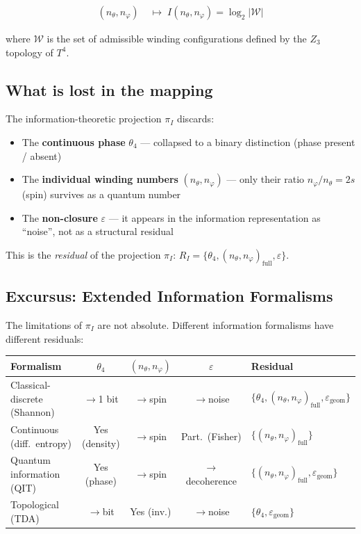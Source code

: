 \begin{align}
  (n_\theta, n_\varphi) &\;\longmapsto\; I(n_\theta, n_\varphi)
  = \log_2 |\mathcal{W}| \tag{243.3}
\end{align}

where $\mathcal{W}$ is the set of admissible winding configurations
defined by the $Z_3$ topology of $T^4$.

\subsection{What is lost in the mapping}

The information-theoretic projection $\pi_I$ discards:

\begin{itemize}
  \item The \textbf{continuous phase} $\theta_4$ --- collapsed to a
        binary distinction (phase present / absent)
  \item The \textbf{individual winding numbers} $(n_\theta, n_\varphi)$
        --- only their ratio $n_\varphi / n_\theta = 2s$ (spin)
        survives as a quantum number
  \item The \textbf{non-closure} $\varepsilon$ --- it appears in the
        information representation as ``noise'', not as a structural residual
\end{itemize}

This is the \emph{residual} of the projection $\pi_I$:
$R_I = \{\theta_4, (n_\theta, n_\varphi)_\text{full}, \varepsilon\}$.


\subsection{Excursus: Extended Information Formalisms}

The limitations of $\pi_I$ are not absolute. Different information
formalisms have different residuals:

\begin{center}
\renewcommand{\arraystretch}{1.3}
{\footnotesize
\begin{tabular}{p{3.2cm}cccp{3.5cm}}
\toprule
\textbf{Formalism} & $\theta_4$ & $(n_\theta,n_\varphi)$ & $\varepsilon$ & \textbf{Residual} \\
\midrule
Classical-discrete (Shannon)
  & $\to$1 bit & $\to$spin & $\to$noise
  & $\{\theta_4, (n_\theta,n_\varphi)_\text{full}, \varepsilon_\text{geom}\}$ \\[3pt]
Continuous (diff.\ entropy)
  & Yes (density) & $\to$spin & Part.\ (Fisher)
  & $\{(n_\theta,n_\varphi)_\text{full}\}$ \\[3pt]
Quantum information (QIT)
  & Yes (phase) & $\to$spin & $\to$decoherence
  & $\{(n_\theta,n_\varphi)_\text{full}, \varepsilon_\text{geom}\}$ \\[3pt]
Topological (TDA)
  & $\to$bit & Yes (inv.) & $\to$noise
  & $\{\theta_4, \varepsilon_\text{geom}\}$ \\
\bottomrule
\end{tabular}
}
\end{center}

